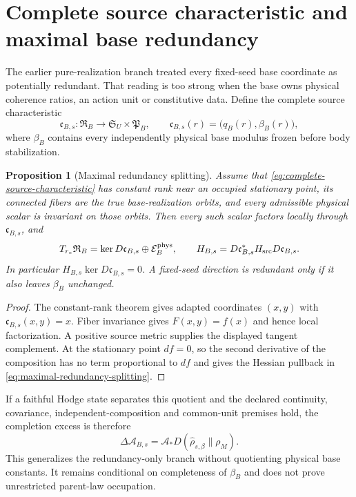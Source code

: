 \documentclass[11pt]{article}
\newtheorem{proposition}{Proposition}
\begin{document}
\tableofcontents
\clearpage

\section{Complete source characteristic and maximal base redundancy}

The earlier pure-realization branch treated every fixed-seed base coordinate
as potentially redundant. That reading is too strong when the base owns
physical coherence ratios, an action unit or constitutive data. Define the
complete source characteristic
\begin{equation}
 \mathfrak c_{B,s}:\mathfrak R_B\longrightarrow
 \mathfrak S_U\times\mathfrak P_B,
 \qquad
 \mathfrak c_{B,s}(r)=\bigl(q_B(r),\beta_B(r)\bigr),
 \label{eq:complete-source-characteristic}
\end{equation}
where $\beta_B$ contains every independently physical base modulus frozen
before body stabilization.

\begin{proposition}[Maximal redundancy splitting]
Assume that \eqref{eq:complete-source-characteristic} has constant rank near
an occupied stationary point, its connected fibers are the true
base-realization orbits, and every admissible physical scalar is invariant on
those orbits. Then every such scalar factors locally through
$\mathfrak c_{B,s}$, and
\begin{equation}
 T_{r_*}\mathfrak R_B
 =\ker D\mathfrak c_{B,s}\oplus\mathcal E_B^{\rm phys},
 \qquad
 H_{B,s}=D\mathfrak c_{B,s}^{*}H_{\rm src}D\mathfrak c_{B,s}.
 \label{eq:maximal-redundancy-splitting}
\end{equation}
In particular $H_{B,s}\ker D\mathfrak c_{B,s}=0$. A fixed-seed direction is
redundant only if it also leaves $\beta_B$ unchanged.
\end{proposition}
\begin{proof}
The constant-rank theorem gives adapted coordinates $(x,y)$ with
$\mathfrak c_{B,s}(x,y)=x$. Fiber invariance gives $F(x,y)=f(x)$ and hence
local factorization. A positive source metric supplies the displayed tangent
complement. At the stationary point $df=0$, so the second derivative of the
composition has no term proportional to $df$ and gives the Hessian pullback
in \eqref{eq:maximal-redundancy-splitting}.
\end{proof}

If a faithful Hodge state separates this quotient and the declared
continuity, covariance, independent-composition and common-unit premises
hold, the completion excess is therefore
\begin{equation}
 \Delta\mathcal A_{B,s}
 =\mathcal A_*D\!\left(\widehat\rho_{s,\beta}\|\rho_M\right).
 \label{eq:augmented-source-fidelity}
\end{equation}
This generalizes the redundancy-only branch without quotienting physical base
constants. It remains conditional on completeness of $\beta_B$ and does not
prove unrestricted parent-law occupation.
\end{document}
